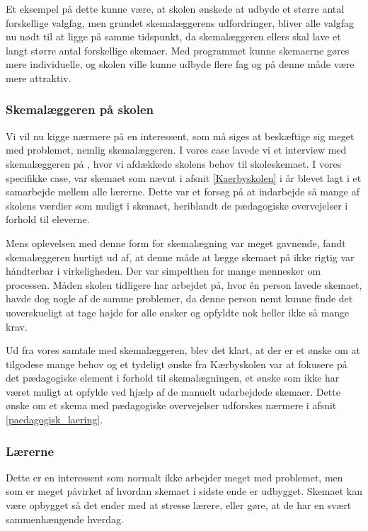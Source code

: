 Et eksempel på dette kunne være, at skolen ønskede at udbyde et større antal forskellige valgfag, men grundet skemalæggerens udfordringer, bliver alle valgfag nu nødt til at ligge på samme tidspunkt, da skemalæggeren ellers skal lave et langt større antal forskellige skemaer. Med programmet kunne skemaerne gøres mere individuelle, og skolen ville kunne udbyde flere fag og på denne måde være mere attraktiv.

\subsubsection{Skemalæggeren på skolen}
Vi vil nu kigge nærmere på en interessent, som må siges at beskæftige sig meget med problemet, nemlig skemalæggeren. I vores case lavede vi et interview med skemalæggeren på \school, hvor vi afdækkede skolens behov til skoleskemaet. I vores specifikke case, var skemaet som nævnt i afsnit \ref{Kaerbyskolen} i år blevet lagt i et samarbejde mellem alle lærerne. Dette var et forsøg på at indarbejde så mange af skolens værdier som muligt i skemaet, heriblandt de pædagogiske overvejelser i forhold til eleverne.

Mens oplevelsen med denne form for skemalægning var meget gavnende, fandt skemalæggeren hurtigt ud af, at denne måde at lægge skemaet på ikke rigtig var håndterbar i virkeligheden. Der var simpelthen for mange mennesker om processen. Måden skolen tidligere har arbejdet på, hvor \'en person lavede skemaet, havde dog nogle af de samme problemer, da denne person nemt kunne finde det uoverskueligt at tage højde for alle ønsker og opfyldte nok heller ikke så mange krav.

Ud fra vores samtale med skemalæggeren, blev det klart, at der er et ønske om at tilgodese mange behov og et tydeligt ønske fra Kærbyskolen var at fokusere på det pædagogiske element i forhold til skemalægningen, et ønske som ikke har været muligt at opfylde ved hjælp af de manuelt udarbejdede skemaer. Dette ønske om et skema med pædagogiske overvejelser udforskes nærmere i afsnit \ref{paedagogisk_laering}.

\subsubsection{Lærerne}
Dette er en interessent som normalt ikke arbejder meget med problemet, men som er meget påvirket af hvordan skemaet i sidste ende er udbygget.  Skemaet kan være opbygget så det ender med at stresse lærere, eller gøre, at de har en svært sammenhængende hverdag. 

